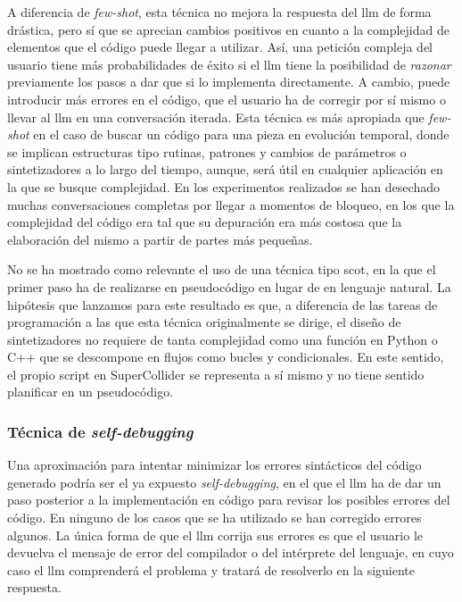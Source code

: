 A diferencia de \emph{few-shot}, esta técnica no mejora la respuesta del \gls{llm} de forma drástica, pero sí que se aprecian cambios positivos en cuanto a la complejidad de elementos que el código puede llegar a utilizar. Así, una petición compleja del usuario tiene más probabilidades de éxito si el \gls{llm} tiene la posibilidad de \emph{razonar} previamente los pasos a dar que si lo implementa directamente. A cambio, puede introducir más errores en el código, que el usuario ha de corregir por sí mismo o llevar al \gls{llm} en una conversación iterada. Esta técnica es más apropiada que \emph{few-shot} en el caso de buscar un código para una pieza en evolución temporal, donde se implican estructuras tipo rutinas, patrones y cambios de parámetros o sintetizadores a lo largo del tiempo, aunque, será útil en cualquier aplicación en la que se busque complejidad. En los experimentos realizados se han desechado muchas conversaciones completas por llegar a momentos de bloqueo, en los que la complejidad del código era tal que su depuración era más costosa que la elaboración del mismo a partir de partes más pequeñas.

No se ha mostrado como relevante el uso de una técnica tipo \gls{scot}, en la que el primer paso ha de realizarse en pseudocódigo en lugar de en lenguaje natural. La hipótesis que lanzamos para este resultado es que, a diferencia de las tareas de programación a las que esta técnica originalmente se dirige, el diseño de sintetizadores no requiere de tanta complejidad como una función en Python o C++ que se descompone en flujos como bucles y condicionales. En este sentido, el propio script en SuperCollider se representa a sí mismo y no tiene sentido planificar en un pseudocódigo.

\subsubsection{Técnica de \emph{self-debugging}}

Una aproximación para intentar minimizar los errores sintácticos del código generado podría ser el ya expuesto \emph{self-debugging}, en el que el \gls{llm} ha de dar un paso posterior a la implementación en código para revisar los posibles errores del código. En ninguno de los casos que se ha utilizado se han corregido errores algunos. La única forma de que el \gls{llm} corrija sus errores es que el usuario le devuelva el mensaje de error del compilador o del intérprete del lenguaje, en cuyo caso el \gls{llm} comprenderá el problema y tratará de resolverlo en la siguiente respuesta. 

